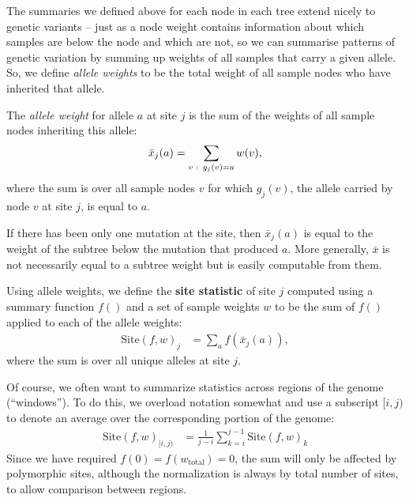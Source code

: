 \documentclass{article}
\newcommand{\site}{\mbox{Site}} %
\newcommand{\iw}{w} %
\newcommand{\tiw}{w_\text{total}} %
\newcommand{\aw}{{\bar x}} %
\begin{document}
The summaries we defined above for each node in each tree
extend nicely to genetic variants
-- just as a node weight contains information about which samples are below the node and which are not,
so we can summarise patterns of genetic variation by summing up weights of all samples
that carry a given allele.
So, we define \emph{allele weights} to be
the total weight of all sample nodes who have inherited that allele.

\begin{definition}
    The \emph{allele weight} for allele $a$ at site $j$ is the sum of the weights
    of all sample nodes inheriting this allele:
    \begin{align*}
        \aw_j(a) = \sum_{v \st g_j(v) = a} \iw(v) ,
    \end{align*}
    where the sum is over all sample nodes $v$ for which
    $g_j(v)$, the allele carried by node $v$ at site $j$, is equal to $a$.
\end{definition}

If there has been only one mutation at the site,
then $\aw_j(a)$ is equal to the weight of the subtree below the mutation that produced $a$.
More generally, $\aw$ is not necessarily equal to a subtree weight
but is easily computable from them.

Using allele weights,
we define the \textbf{site statistic} of site $j$ computed using a summary function $f()$
and a set of sample weights $\iw$
to be the sum of $f()$ applied to each of the allele weights:
\begin{align}
    \site(f, \iw)_j
    &=
    \sum_{a} f(\aw_j(a)) ,
\end{align}
where the sum is over all unique alleles at site $j$.

Of course, we often want to summarize statistics across regions of the genome (``windows'').
To do this, we overload notation somewhat and use a subscript $[i,j)$ to denote an average
over the corresponding portion of the genome:
\begin{align}
    \site(f, \iw)_{[i,j)}
    &=
    \frac{1}{j-i} \sum_{k=i}^{j-1} \site(f, \iw)_k
\end{align}
Since we have required $f(0) = f(\tiw) = 0$,
the sum will only be affected by polymorphic sites,
although the normalization is always by total number of sites, to allow comparison between regions.
\end{document}
